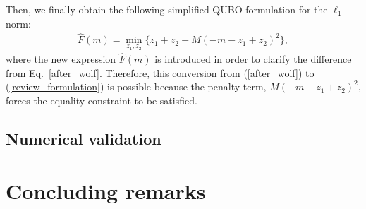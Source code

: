 \documentclass[fp,twocolumn]{jpsj3}
\begin{document}
Then, we finally obtain the following simplified QUBO formulation for the $\ell_{1}$-norm:
\begin{align}
\widehat{F}(m) = \min_{z_{1},z_{2}}{\{z_{1}+z_{2}+M(-m-z_{1}+z_{2})^{2}\}, \label{review_formulation}}
\end{align}
where the new expression $\widehat{F}(m)$ is introduced in order to clarify the difference from Eq.~\eqref{after_wolf}.
Therefore, this conversion from (\ref{after_wolf}) to (\ref{review_formulation}) is possible because the penalty term, $M(-m-z_{1}+z_{2})^{2}$, forces the equality constraint to be satisfied.


\subsection{Numerical validation} %


\section{Concluding remarks}




\begin{acknowledgment}



\end{acknowledgment}

\end{document}
